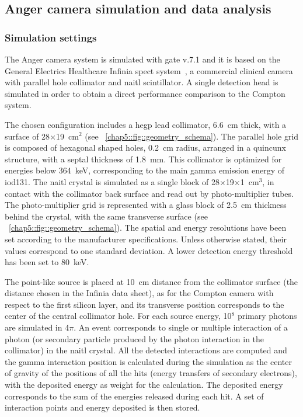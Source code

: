 \subsection{Anger camera simulation and data analysis}\label{chap5::subsec::Anger_descr}

\subsubsection{Simulation settings}\label{chap5::subsubsec::AC_settings}
The Anger camera system is simulated with \gls{gate} v.7.1 and it is based on the General Electrics Healthcare Infinia \gls{spect} system~\parencite{GeneralElectrics2006}, a commercial clinical camera with parallel hole collimator and \gls{naitl} scintillator. A single detection head is simulated in order to obtain a direct performance comparison to the Compton system.

The chosen configuration includes a \gls{hegp} lead collimator, 6.6~cm thick, with a surface of 28$\times$19~cm$^{2}$ (see \figurename~\ref{chap5::fig::geometry_schema}). The parallel hole grid is composed of hexagonal shaped holes, 0.2~cm radius, arranged in a quincunx structure, with a septal thickness of 1.8~mm. This collimator is optimized for energies below 364~keV, corresponding to the main gamma emission energy of \gls{iod131}. The \gls{naitl} crystal is simulated as a single block of 28$\times$19$\times$1~cm$^{3}$, in contact with the collimator back surface and read out by photo-multiplier tubes. The photo-multiplier grid is represented with a glass block of 2.5~cm thickness behind the crystal, with the same transverse surface (see \figurename~\ref{chap5::fig::geometry_schema}). The spatial and energy resolutions have been set according to the manufacturer specifications. Unless otherwise stated, their values correspond to one standard deviation. A lower detection energy threshold has been set to 80~keV.

The point-like source is placed at 10~cm distance from the collimator surface (the distance chosen in the Infinia data sheet), as for the Compton camera with respect to the first silicon layer, and its transverse position corresponds to the center of the central collimator hole. For each source energy, 10$^{8}$ primary photons are simulated in 4$\pi$. An event corresponds to single or multiple interaction of a photon (or secondary particle produced by the photon interaction in the collimator) in the \gls{naitl} crystal. All the detected interactions are computed and the gamma interaction position is calculated during the simulation as the center of gravity of the positions of all the hits (energy transfers of secondary electrons), with the deposited energy as weight for the calculation. The deposited energy corresponds to the sum of the energies released during each hit. A set of interaction points and energy deposited is then stored. 

